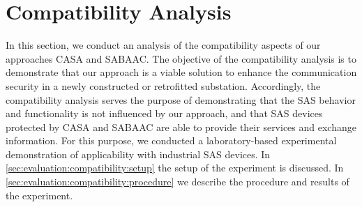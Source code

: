 \section{Compatibility Analysis}
In this section, we conduct an analysis of the compatibility aspects of our approaches CASA and SABAAC.
The objective of the compatibility analysis is to demonstrate that our approach is a viable solution to enhance the communication security in a newly constructed or retrofitted substation.
Accordingly, the compatibility analysis serves the purpose of demonstrating that the SAS behavior and functionality is not influenced by our approach, and that SAS devices protected by CASA and SABAAC are able to provide their services and exchange information.
For this purpose, we conducted a laboratory-based experimental demonstration of applicability with industrial SAS devices.
In \autoref{sec:evaluation:compatibility:setup} the setup of the experiment is discussed.
In \autoref{sec:evaluation:compatibility:procedure} we describe the procedure and results of the experiment.

